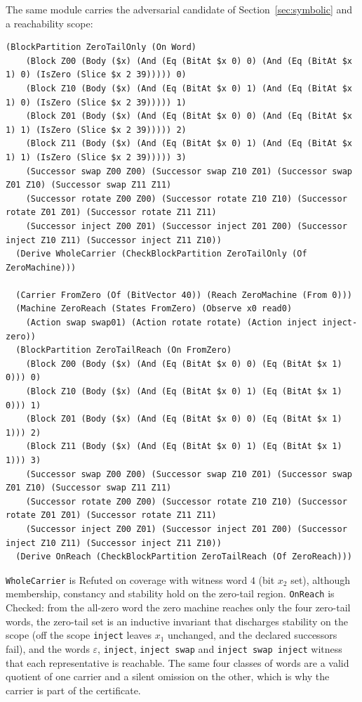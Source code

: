 \documentclass[11pt]{article}
\newcommand{\code}[1]{\texttt{#1}}
\theoremstyle{definition}
\theoremstyle{plain}
\begin{document}
The same module carries the adversarial candidate of Section~\ref{sec:symbolic} and a reachability
scope:
\begin{lstlisting}[basicstyle=\ttfamily\footnotesize,title={\scriptsize\ttfamily fixtures/forty\_bits.metta}]
  (BlockPartition ZeroTailOnly (On Word)
    (Block Z00 (Body ($x) (And (Eq (BitAt $x 0) 0) (And (Eq (BitAt $x 1) 0) (IsZero (Slice $x 2 39))))) 0)
    (Block Z10 (Body ($x) (And (Eq (BitAt $x 0) 1) (And (Eq (BitAt $x 1) 0) (IsZero (Slice $x 2 39))))) 1)
    (Block Z01 (Body ($x) (And (Eq (BitAt $x 0) 0) (And (Eq (BitAt $x 1) 1) (IsZero (Slice $x 2 39))))) 2)
    (Block Z11 (Body ($x) (And (Eq (BitAt $x 0) 1) (And (Eq (BitAt $x 1) 1) (IsZero (Slice $x 2 39))))) 3)
    (Successor swap Z00 Z00) (Successor swap Z10 Z01) (Successor swap Z01 Z10) (Successor swap Z11 Z11)
    (Successor rotate Z00 Z00) (Successor rotate Z10 Z10) (Successor rotate Z01 Z01) (Successor rotate Z11 Z11)
    (Successor inject Z00 Z01) (Successor inject Z01 Z00) (Successor inject Z10 Z11) (Successor inject Z11 Z10))
  (Derive WholeCarrier (CheckBlockPartition ZeroTailOnly (Of ZeroMachine)))

  (Carrier FromZero (Of (BitVector 40)) (Reach ZeroMachine (From 0)))
  (Machine ZeroReach (States FromZero) (Observe x0 read0)
    (Action swap swap01) (Action rotate rotate) (Action inject inject-zero))
  (BlockPartition ZeroTailReach (On FromZero)
    (Block Z00 (Body ($x) (And (Eq (BitAt $x 0) 0) (Eq (BitAt $x 1) 0))) 0)
    (Block Z10 (Body ($x) (And (Eq (BitAt $x 0) 1) (Eq (BitAt $x 1) 0))) 1)
    (Block Z01 (Body ($x) (And (Eq (BitAt $x 0) 0) (Eq (BitAt $x 1) 1))) 2)
    (Block Z11 (Body ($x) (And (Eq (BitAt $x 0) 1) (Eq (BitAt $x 1) 1))) 3)
    (Successor swap Z00 Z00) (Successor swap Z10 Z01) (Successor swap Z01 Z10) (Successor swap Z11 Z11)
    (Successor rotate Z00 Z00) (Successor rotate Z10 Z10) (Successor rotate Z01 Z01) (Successor rotate Z11 Z11)
    (Successor inject Z00 Z01) (Successor inject Z01 Z00) (Successor inject Z10 Z11) (Successor inject Z11 Z10))
  (Derive OnReach (CheckBlockPartition ZeroTailReach (Of ZeroReach)))
\end{lstlisting}
\code{WholeCarrier} is Refuted on coverage with witness word $4$ (bit $x_2$ set), although
membership, constancy and stability hold on the zero-tail region. \code{OnReach} is Checked: from
the all-zero word the zero machine reaches only the four zero-tail words, the zero-tail set is an
inductive invariant that discharges stability on the scope (off the scope \code{inject} leaves $x_1$
unchanged, and the declared successors fail), and the words $\varepsilon$,
\code{inject}, \code{inject swap} and \code{inject swap inject} witness that each representative is
reachable. The same four classes of words are a valid quotient of one carrier and a silent omission on the other, which is why the carrier is part of the certificate.
\end{document}
